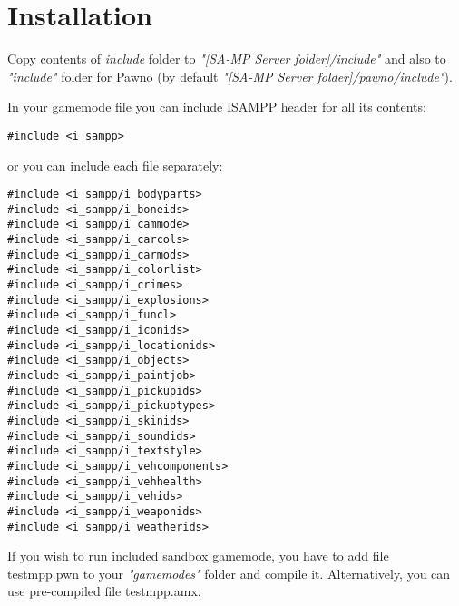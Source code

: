 \documentclass{article}
\begin{document}
\newpage
\section{Installation}
Copy contents of \textit{include} folder to \textit{"[SA-MP Server folder]/include"} and also to \textit{"include"} folder for Pawno (by default \textit{"[SA-MP Server folder]/pawno/include"}).

\bigskip
\noindent In your gamemode file you can include ISAMPP header for all its contents:
\begin{verbatim}
#include <i_sampp>
\end{verbatim}
or you can include each file separately:
\begin{verbatim}
#include <i_sampp/i_bodyparts>
#include <i_sampp/i_boneids>
#include <i_sampp/i_cammode>
#include <i_sampp/i_carcols>
#include <i_sampp/i_carmods>
#include <i_sampp/i_colorlist>
#include <i_sampp/i_crimes>
#include <i_sampp/i_explosions>
#include <i_sampp/i_funcl>
#include <i_sampp/i_iconids>
#include <i_sampp/i_locationids>
#include <i_sampp/i_objects>
#include <i_sampp/i_paintjob>
#include <i_sampp/i_pickupids>
#include <i_sampp/i_pickuptypes>
#include <i_sampp/i_skinids>
#include <i_sampp/i_soundids>
#include <i_sampp/i_textstyle>
#include <i_sampp/i_vehcomponents>
#include <i_sampp/i_vehhealth>
#include <i_sampp/i_vehids>
#include <i_sampp/i_weaponids>
#include <i_sampp/i_weatherids>
\end{verbatim}
If you wish to run included sandbox gamemode, you have to add file testmpp.pwn to your \textit{"gamemodes"} folder and compile it. Alternatively, you can use pre-compiled file testmpp.amx.


\newpage
\end{document}
